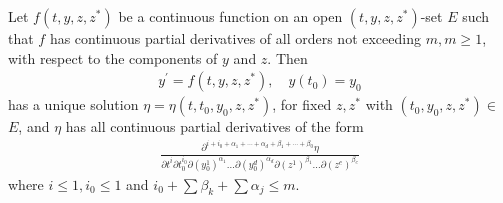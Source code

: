 \documentclass{article}
\begin{document}
\begin{thma}
  Let $f\left(t, y, z, z^{*}\right)$ be a continuous function on an open $\left(t, y, z, z^{*}\right)$-set $E$ such that $f$ has continuous partial derivatives of all orders not exceeding $m, m \ge 1$, with respect to the components of $y$ and $z$. Then
\begin{align}
y^{\prime}=f\left(t, y, z, z^{*}\right), \quad y\left(t_{0}\right)=y_{0}
\end{align}
has a unique solution $\eta=\eta\left(t, t_{0}, y_{0}, z, z^{*}\right)$, for fixed $z, z^{*}$ with $\left(t_{0}, y_{0}, z, z^{*}\right) \in$ $E$, and $\eta$ has all continuous partial derivatives of the form
\begin{align}
\frac{\partial^{i+i_{0}+\alpha_{1}+\cdots+\alpha_{d}+\beta_{1}+\cdots+\beta_{0}} \eta}{\partial t^{i} \partial t_{0}^{i_{0}} \partial\left(y_{0}^{1}\right)^{\alpha_{1}} \ldots \partial\left(y_{0}^{d}\right)^{\alpha_{d}} \partial\left(z^{1}\right)^{\beta_{1}} \ldots \partial\left(z^{e}\right)^{\beta_{e}}}\label{eq:4.2idnjf}
\end{align}
where $i \le 1, i_{0} \le 1$ and $i_{0}+\sum \beta_{k}+\sum \alpha_{j} \le m$.
\end{thma}
\end{document}
